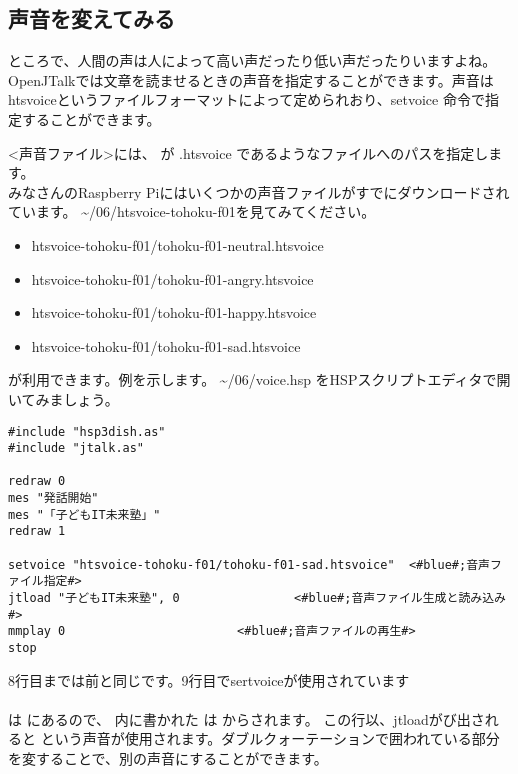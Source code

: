 \subsection{声音を変えてみる}
ところで、人間の声は人によって高い声だったり低い声だったりいますよね。OpenJTalkでは文章を読ませるときの声音を指定することができます。声音はhtsvoiceというファイルフォーマットによって定められおり、setvoice 命令で指定することができます。\\

<声音ファイル>には、 が .htsvoice であるようなファイルへのパスを指定します。\\
みなさんのRaspberry Piにはいくつかの声音ファイルがすでにダウンロードされています。  \textasciitilde /06/htsvoice-tohoku-f01を見てみてください。

\begin{itemize}
\item htsvoice-tohoku-f01/tohoku-f01-neutral.htsvoice
\item htsvoice-tohoku-f01/tohoku-f01-angry.htsvoice
\item htsvoice-tohoku-f01/tohoku-f01-happy.htsvoice
\item htsvoice-tohoku-f01/tohoku-f01-sad.htsvoice
\end{itemize}

が利用できます。例を示します。 \textasciitilde /06/voice.hsp をHSPスクリプトエディタで開いてみましょう。\\

\begin{lstlisting}[caption=voice.hsp,label=voice.hsp]
#include "hsp3dish.as"
#include "jtalk.as"

redraw 0
mes "発話開始"
mes "「子どもIT未来塾」"
redraw 1

setvoice "htsvoice-tohoku-f01/tohoku-f01-sad.htsvoice"	<#blue#;音声ファイル指定#>
jtload "子どもIT未来塾", 0				<#blue#;音声ファイル生成と読み込み#>
mmplay 0						<#blue#;音声ファイルの再生#>
stop
\end{lstlisting}

8行目までは前と同じです。9行目でsertvoiceが使用されています\\
\\
 は  にあるので、
 内に書かれた 
は  からされます。
この行以、jtloadがび出されると 
という声音が使用されます。ダブルクォーテーションで囲われている部分を変することで、別の声音にすることができます。\\

\begin{tcolorbox}[title=\useOmetoi]
\begin{enumerate}
\end{enumerate}
\end{tcolorbox}
